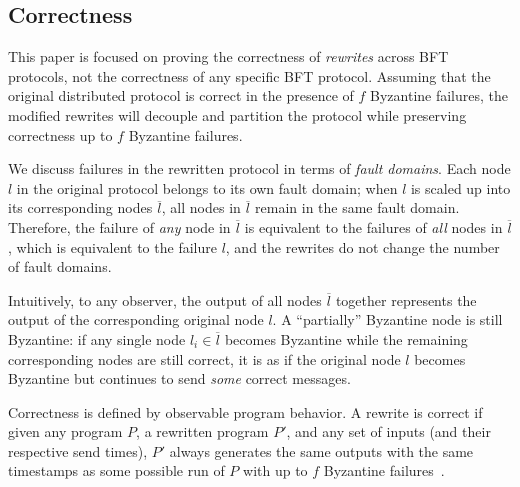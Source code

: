 \subsection{Correctness}
\label{sec:correctness}

This paper is focused on proving the correctness of \emph{rewrites} across BFT protocols, not the correctness of any specific BFT protocol.
Assuming that the original distributed protocol is correct in the presence of $f$ Byzantine failures, the modified rewrites will decouple and partition the protocol while preserving correctness up to $f$ Byzantine failures.

We discuss failures in the rewritten protocol in terms of \emph{fault domains}.
Each node $l$ in the original protocol belongs to its own fault domain; when $l$ is scaled up into its corresponding nodes $\overline{l}$, all nodes in $\overline{l}$ remain in the same fault domain.
Therefore, the failure of \emph{any} node in $\overline{l}$ is equivalent  to the failures of \emph{all} nodes in $\overline{l}$, which is equivalent to the failure $l$, and the rewrites do not change the number of fault domains.

Intuitively, to any observer, the output of all nodes $\overline{l}$ together represents the output of the corresponding original node $l$.
A ``partially'' Byzantine node is still Byzantine: if any single node $l_i \in \overline{l}$ becomes Byzantine while the remaining corresponding nodes are still correct, it is as if the original node $l$ becomes Byzantine but continues to send \textit{some} correct messages.

Correctness is defined by observable program behavior.
A rewrite is correct if given any program $P$, a rewritten program $P'$, and any set of inputs (and their respective send times), $P'$ always generates the same outputs with the same timestamps as some possible run of $P$ with up to $f$ Byzantine failures~\cite{autocomp}.


